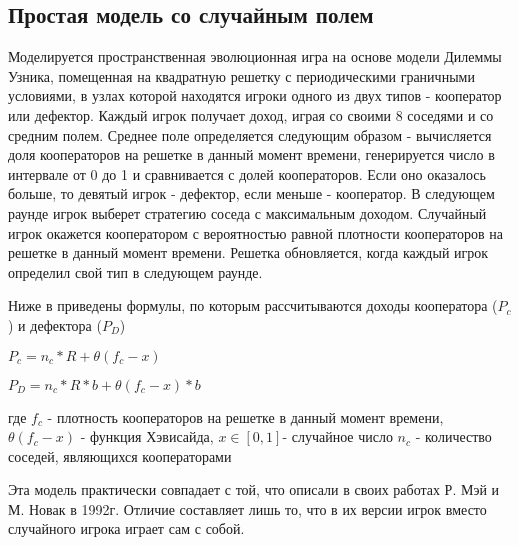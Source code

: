 \documentclass[12pt,a4paper]{article}
\begin{document}
	\subsection{Простая модель со случайным полем}
	
	\par Моделируется пространственная эволюционная игра на основе модели
	Дилеммы Узника, помещенная на квадратную решетку с периодическими граничными
	условиями, в узлах которой находятся игроки одного из двух типов - кооператор 
	или дефектор. Каждый игрок получает доход, играя со своими 8 соседями и со средним полем. Среднее поле определяется следующим образом - вычисляется доля кооператоров на решетке в данный момент времени, генерируется число в интервале от 0 до 1 и сравнивается с долей кооператоров. Если оно оказалось больше, то девятый игрок - дефектор, если меньше - кооператор. В следующем раунде игрок выберет стратегию соседа с максимальным доходом. Случайный игрок окажется кооператором с вероятностью
	равной плотности кооператоров на решетке в данный момент времени. Решетка 
	обновляется, когда каждый игрок определил свой тип в следующем раунде.
	
	\par Ниже в приведены формулы, по которым рассчитываются доходы кооператора ($P_{c}$) и дефектора ($P_{D}$)
	
	$ P_{c}= n_{c}*R+ \theta(f_{c}-x) $
	
	$ P_{D}= n_{c}*R*b+ \theta(f_{c}-x)*b $
	
	где $ f_{c}$ - плотность кооператоров на решетке в данный момент
	времени, $\theta(f_{c}-x)$ - функция Хэвисайда, $x \in [0,1]$- случайное число
	$n_{c}$ - количество соседей, являющихся кооператорами
	 
	
	\par Эта модель практически совпадает с той, что описали в своих работах Р. Мэй и
	М. Новак в 1992г. Отличие составляет лишь то, что в их версии игрок вместо случайного
	игрока играет сам с собой.
	
\end{document}
